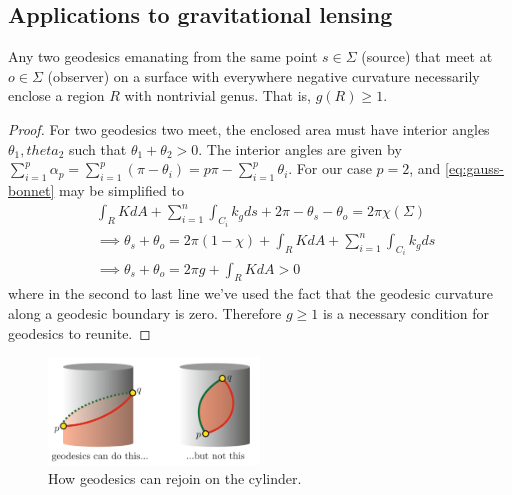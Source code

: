 \subsection{Applications to gravitational lensing}
\begin{theorem}[]\label{thm:nontrivial-topology}
Any two geodesics emanating from the same point $s \in \Sigma$ (source) that meet at $o \in \Sigma$ (observer) on a surface with everywhere negative curvature necessarily enclose a region $R$ with nontrivial genus. That is, $g(R) \ge 1$.
\end{theorem}
\begin{proof}
For two geodesics two meet, the enclosed area must have interior angles $\theta_1, theta_2$ such that $\theta_1 + \theta_2 > 0$. The interior angles are given by $\sum_{i=1}^p \alpha_p = \sum_{i=1}^p(\pi-\theta_i) = p \pi - \sum_{i=1}^p \theta_i$. For our case $p=2$, and \cref{eq:gauss-bonnet} may be simplified to
\begin{align*}
&\int_R K dA + \sum_{i=1}^n \int_{C_i} k_g ds + 2 \pi - \theta_s - \theta_o = 2 \pi \chi(\Sigma) \\
&\implies \theta_s + \theta_o = 2 \pi (1 - \chi) + \int_R K dA + \sum_{i=1}^n \int_{C_i} k_g ds \\
&\implies \theta_s + \theta_o = 2 \pi g + \int_R K dA > 0
\end{align*}
where in the second to last line we've used the fact that the geodesic curvature along a geodesic boundary is zero.
Therefore $g \ge 1$ is a necessary condition for geodesics to reunite.
\end{proof}
\begin{figure}[!htb]
	\centering
	\includegraphics[width=0.5\textwidth]{img/geodesics-on-cylinder.png}
	\caption{How geodesics can rejoin on the cylinder.}
	\label{}
\end{figure}


